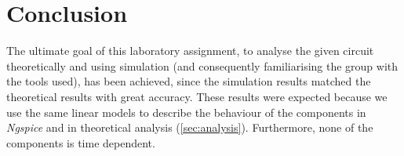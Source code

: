 \section{Conclusion}
\label{sec:conclusion}


The ultimate goal of this laboratory assignment, to analyse
the given circuit theoretically and using simulation (and consequently
familiarising the group with the tools used), has been achieved, since
the simulation results matched the theoretical results with great accuracy.
These results were expected because we use the same linear models to
describe the behaviour of the components in \textit{Ngspice} and in
theoretical analysis (\ref{sec:analysis}). Furthermore, none of
the components is time dependent.

